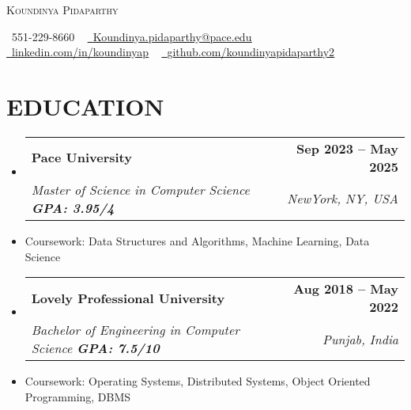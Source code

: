 \documentclass[letterpaper,11pt]{article}
\makeatletter
\newcommand{\resumeSubheading}[4]{
  \vspace{-2pt}\item
    \begin{tabular*}{1.0\textwidth}[t]{l@{\extracolsep{\fill}}r}
      \textbf{#1} & \textbf{\small #2} \\
      \textit{\small#3} & \textit{\small #4} \\
    \end{tabular*}\vspace{-7pt}
}
\newcommand{\resumeSubHeadingListStart}{\begin{itemize}[leftmargin=0.0in, label={}]}
\newcommand{\resumeSubHeadingListEnd}{\end{itemize}}
\makeatother
\begin{document}

\begin{center}
    {\Huge \scshape Koundinya Pidaparthy} \\ \vspace{1pt}
    
    \small \raisebox{-0.1\height}\faPhone\ 551-229-8660 ~ \href{mailto:x@gmail.com}{\raisebox{-0.2\height}\faEnvelope\  \underline{Koundinya.pidaparthy@pace.edu}} ~ 
    \href{https://linkedin.com/in//}{\raisebox{-0.2\height}\faLinkedin\ \underline{linkedin.com/in/koundinyap}}  ~
    \href{https://github.com/}{\raisebox{-0.2\height}\faGithub\ \underline{github.com/koundinyapidaparthy2}}
    \vspace{-8pt}
\end{center}


\section{EDUCATION}
  \resumeSubHeadingListStart
    \resumeSubheading
      {Pace University}{Sep 2023 -- May 2025}
      {\textnormal{Master of Science in Computer Science \textbf{GPA: 3.95/4}}}{NewYork, NY, USA}
      \vspace{-6pt}
        \item[]{Coursework:} Data Structures and Algorithms, Machine Learning, Data Science
       

    \resumeSubheading
      {Lovely Professional University}{Aug 2018 -- May 2022}
      {\textnormal{Bachelor of Engineering in Computer Science \textbf{GPA: 7.5/10}}}{Punjab, India}
      \vspace{-6pt}
        \item[]{Coursework:} Operating Systems, Distributed Systems, Object Oriented Programming, DBMS
  \resumeSubHeadingListEnd
\end{document}
